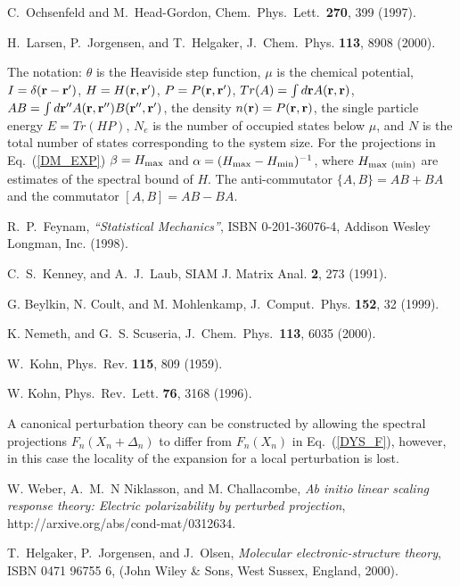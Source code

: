 \begin{references}
 C.\ Ochsenfeld and M.\ Head-Gordon,
Chem.\ Phys.\ Lett.\ {\bf 270}, 399 (1997).

 H.\ Larsen, P.\ Jorgensen, and T.\ Helgaker,
J.\ Chem.\ Phys. {\bf 113}, 8908 (2000).

 The notation: $\theta$ is the Heaviside step function,
$\mu$ is the chemical potential, 
$I = \delta({\bf r-r'})$, $H = H({\bf r,r'})$, $P = P({\bf r,r'})$,
$Tr(A) = \int d{\bf r} A({\bf r,r})$, $AB = \int d{\bf r''} A({\bf r,r''})B(\bf r'',r')$,
the density $n({\bf r}) = P({\bf r,r})$, the single particle energy $E = Tr(HP)$,
$N_e$ is the number of occupied states below $\mu$, and 
$N$ is the total number of states corresponding to the system size.
For the projections in Eq.\ (\ref{DM_EXP}) $\beta = H_{\rm max}$ and
$\alpha = (H_{\rm max} - H_{\rm min})^{-1}$, where $H_{\rm max~(min)}$
are estimates of the spectral bound of $H$.  The anti-commutator 
$\{A,B\} = AB+BA$ and the commutator $[A,B] = AB-BA$.

 R.\ P.\ Feynam, {\em ``Statistical Mechanics''},
ISBN 0-201-36076-4, Addison Wesley Longman, Inc. (1998).

 C.\ S.\ Kenney, and A.\ J.\ Laub,
SIAM J. Matrix Anal. {\bf 2}, 273 (1991).

 G. Beylkin, N. Coult, and M. Mohlenkamp,
J.\ Comput.\ Phys. {\bf 152}, 32 (1999).

 K. Nemeth, and G.\ S. Scuseria,
J.\ Chem.\ Phys.\ {\bf 113}, 6035 (2000).

 W.\ Kohn,
Phys.\ Rev. {\bf 115}, 809 (1959).


 W. Kohn, Phys.\ Rev.\ Lett. {\bf 76}, 3168 (1996).

 A canonical perturbation theory can be constructed
by allowing the spectral projections $F_n(X_n+\Delta_n)$ to differ
from $F_n(X_n)$ in Eq.\ (\ref{DYS_F}), however, in this case the
locality of the expansion for a local perturbation is lost.

 W. Weber, A.\ M.\ N Niklasson, and M. Challacombe,
{\it Ab initio linear scaling response theory: Electric polarizability 
by perturbed projection}, http://arxive.org/abs/cond-mat/0312634.

 T.\ Helgaker, P.\ Jorgensen, and J.\ Olsen, 
{\em Molecular electronic-structure theory}, ISBN 0471 96755 6, 
(John Wiley \& Sons, West Sussex, England, 2000).


\end{references}
